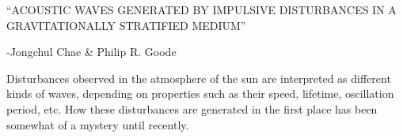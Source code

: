 \documentclass[12pt]{article}
\begin{document}
\begin{centering}
    {\large ``ACOUSTIC WAVES GENERATED BY IMPULSIVE DISTURBANCES IN A
    GRAVITATIONALLY STRATIFIED MEDIUM''}
\end{centering}
\begin{centering}
    -Jongchul Chae \& Philip R. Goode
\end{centering}

Disturbances observed in the atmosphere of the sun are interpreted as different
kinds of waves, depending on properties such as their speed, lifetime,
oscillation period, etc. How these disturbances are generated in the first
place has been somewhat of a mystery until recently.


%
\end{document}
